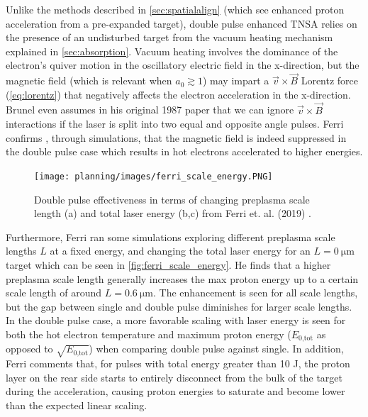 Unlike the methods described in \autoref{sec:spatialalign} (which see enhanced proton acceleration from a pre-expanded target), double pulse enhanced \gls{TNSA} relies on the presence of an undisturbed target from the vacuum heating mechanism \cite{Brunel_1987_PRL} explained in \autoref{sec:absorption}. Vacuum heating involves the dominance of the electron's quiver motion in the oscillatory electric field in the x-direction, but the magnetic field (which is relevant when $a_0 \gtrsim 1$) may impart a $\vec{v} \times \vec{B}$ Lorentz force (\autoref{eq:lorentz}) that negatively affects the electron acceleration in the x-direction. Brunel even assumes in his original 1987 paper \cite{Brunel_1987_PRL} that we can ignore $\vec{v} \times \vec{B}$ interactions if the laser is split into two equal and opposite angle pulses. Ferri confirms \cite{Ferri_2019_Nat_Comm}, through simulations, that the magnetic field is indeed suppressed in the double pulse case which results in hot electrons accelerated to higher energies. 

\begin{figure}
	\centering 
	\texttt{[image: planning/images/ferri\_scale\_energy.PNG]}
	\caption{Double pulse effectiveness in terms of changing preplasma scale length (a) and total laser energy (b,c) from Ferri et. al. (2019) \cite{Ferri_2019_Nat_Comm}.}
	\label{fig:ferri_scale_energy}
\end{figure}

Furthermore, Ferri ran some simulations exploring different preplasma scale lengths $L$ at a fixed energy, and changing the total laser energy for an $L=\SI{0}{\micro \meter}$ target \cite{Ferri_2019_Nat_Comm} which can be seen in \autoref{fig:ferri_scale_energy}. He finds that a higher preplasma scale length generally increases the max proton energy up to a certain scale length of around $L = \SI{0.6}{\micro \meter}$. The enhancement is seen for all scale lengths, but the gap between single and double pulse diminishes for larger scale lengths. In the double pulse case, a more favorable scaling with laser energy is seen for both the hot electron temperature and maximum proton energy ($E_\text{0,tot}$ as opposed to $\sqrt{E_\text{0,tot}}$) when comparing double pulse against single. In addition, Ferri comments that, for pulses with total energy greater than 10 J, the proton layer on the rear side starts to entirely disconnect from the bulk of the target during the acceleration, causing proton energies to saturate and become lower than the expected linear scaling.

